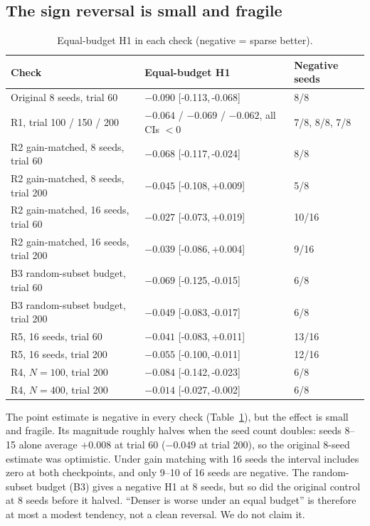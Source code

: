 \documentclass[11pt]{article}
\newcommand{\ci}[2]{[#1,\,#2]}
\begin{document}
\subsection{The sign reversal is small and fragile}

\begin{table}[ht]
\centering
\small
\caption{Equal-budget H1 in each check (negative = sparse better).}
\label{tab:reversal}
\begin{tabular}{lll}
\toprule
Check & Equal-budget H1 & Negative seeds\\
\midrule
Original 8 seeds, trial 60 & $-0.090$ \ci{-0.113}{-0.068} & 8/8\\
R1, trial 100 / 150 / 200 & $-0.064$ / $-0.069$ / $-0.062$, all CIs $<0$ & 7/8, 8/8, 7/8\\
R2 gain-matched, 8 seeds, trial 60 & $-0.068$ \ci{-0.117}{-0.024} & 8/8\\
R2 gain-matched, 8 seeds, trial 200 & $-0.045$ \ci{-0.108}{+0.009} & 5/8\\
R2 gain-matched, 16 seeds, trial 60 & $-0.027$ \ci{-0.073}{+0.019} & 10/16\\
R2 gain-matched, 16 seeds, trial 200 & $-0.039$ \ci{-0.086}{+0.004} & 9/16\\
B3 random-subset budget, trial 60 & $-0.069$ \ci{-0.125}{-0.015} & 6/8\\
B3 random-subset budget, trial 200 & $-0.049$ \ci{-0.083}{-0.017} & 6/8\\
R5, 16 seeds, trial 60 & $-0.041$ \ci{-0.083}{+0.011} & 13/16\\
R5, 16 seeds, trial 200 & $-0.055$ \ci{-0.100}{-0.011} & 12/16\\
R4, $N=100$, trial 200 & $-0.084$ \ci{-0.142}{-0.023} & 6/8\\
R4, $N=400$, trial 200 & $-0.014$ \ci{-0.027}{-0.002} & 6/8\\
\bottomrule
\end{tabular}
\end{table}

The point estimate is negative in every check (Table~\ref{tab:reversal}), but
the effect is small and fragile. Its magnitude roughly halves when the seed
count doubles: seeds 8--15 alone average $+0.008$ at trial 60 ($-0.049$ at
trial 200), so the original 8-seed estimate was optimistic. Under gain
matching with 16 seeds the interval includes zero at both checkpoints, and
only 9--10 of 16 seeds are negative. The random-subset budget (B3) gives a
negative H1 at 8 seeds, but so did the original control at 8 seeds before it
halved. ``Denser is worse under an equal budget'' is therefore at most a
modest tendency, not a clean reversal. We do not claim it.
\end{document}
